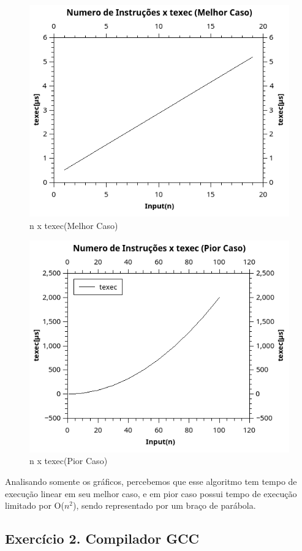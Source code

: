\documentclass[12pt]{article}
\begin{document}
\begin{figure}[H]
	\centering
	\includegraphics[width=.8\textwidth]{txnMC.png}
	\caption{n x texec(Melhor Caso)}
	\label{fig:txnMC}
\end{figure}

\begin{figure}[H]
	\centering
	\includegraphics[width=.8\textwidth]{txnPC.png}
	\caption{n x texec(Pior Caso)}
	\label{fig:txnPC}
\end{figure}

Analisando somente os gráficos, percebemos que esse algoritmo tem tempo de execução linear em seu melhor caso, e em pior caso possui tempo de execução limitado por O(\(n^2\)), sendo representado por um braço de parábola.

\subsection{Exercício 2. Compilador GCC}
\label{subsec:comp}
\end{document}
